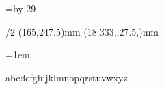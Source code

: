
\fontfam[ebgaramond]

\currvar



\typosize[12.5/15.71]

\def\titlcap#1{%
	{\setff{+titl}\currvar #1}%
}


\svlang


\hsize=110mm
\vsize=\topskip \advance \vsize by 29\baselineskip

\margins/2 (165,247.5)mm (18.333,,27.5,)mm

\baselineskip


\def\myred{\setcmykcolor{0 1 1 0.10}}


\parskip=0pt
\parindent=1em

\def\startblockquote{%
	\par
	\vskip\baselineskip
	\it
	\advance\leftskip by 2\parindent
	\rightskip=\leftskip
	\_firstnoindent
}

\def\stopblockquote{%
	\par
	\vskip\baselineskip
	\rm
	\advance\leftskip by -2\parindent
	\rightskip=\leftskip
	\_firstnoindent
}


\def\person#1{%
	\vfill\break
	\ifodd\pageno
		\else \null \vfill\break
	\fi
	{\typosize[16/]\currvar
	 \smash{\centerline{#1}}%
	 \vskip4\baselineskip
	 \_firstnoindent
	}%
}

\def\couple#1#2{%
	\vfill\break
	\ifodd\pageno
		\else \null \vfill\break
	\fi
	{\typosize[15/]\currvar 
	 \smash{\centerline{#1}}%
	 \vskip0.5\baselineskip
	 \smash{\centerline{\&}}%
	 \vskip0.5\baselineskip
	 \smash{\centerline{#2}}%
	 \vskip4\baselineskip
	 \_firstnoindent
	}%
}


\newbox\alphabetbox \setbox\alphabetbox\hbox{abcdefghijklmnopqrstuvwxyz}
\the\wd\alphabetbox



